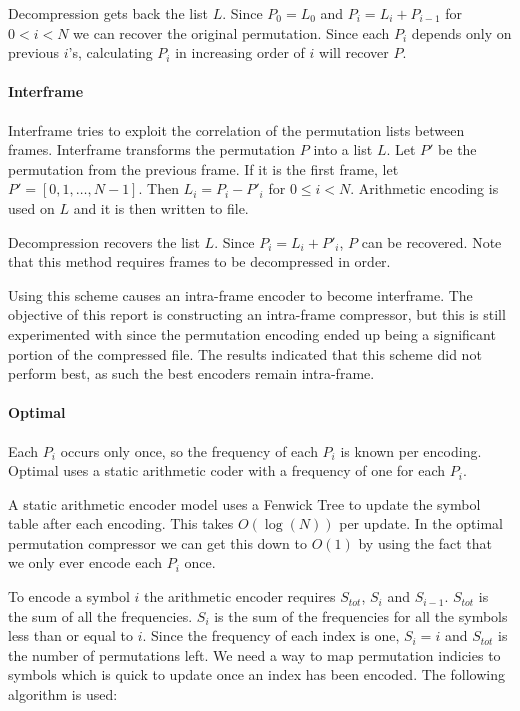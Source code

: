 \documentclass[a4paper]{report}
\begin{document}
Decompression gets back the list $L$. Since $P_0 = L_0$ and $P_i = L_i +
P_{i-1}$ for $0 < i < N$ we can recover the original permutation. Since each
$P_i$ depends only on previous $i$'s, calculating $P_i$ in increasing order of
$i$ will recover $P$.

\paragraph{Interframe}
Interframe tries to exploit the correlation of the permutation lists between
frames. Interframe transforms the permutation $P$ into a list $L$. Let $P'$ be
the permutation from the previous frame. If it is the first frame, let $P' =
[0,1,\dots,N-1]$. Then $L_i = P_i - P'_i$ for $0 \le i < N$. Arithmetic
encoding is used on $L$ and it is then written to file.

Decompression recovers the list $L$. Since $P_i = L_i + P'_i$, $P$ can be
recovered. Note that this method requires frames to be decompressed in order.

Using this scheme causes an intra-frame encoder to become interframe. The
objective of this report is constructing an intra-frame compressor, but this
is still experimented with since the permutation encoding ended up being a
significant portion of the compressed file. The results indicated that this
scheme did not perform best, as such the best encoders remain intra-frame.

\paragraph{Optimal}
Each $P_i$ occurs only once, so the frequency of each $P_i$ is known per
encoding. Optimal uses a static arithmetic coder with a frequency of one for
each $P_i$.

A static arithmetic encoder model uses a Fenwick Tree \citep{fenwick1994new}
to update the symbol table after each encoding. This takes $O(\log(N))$ per
update. In the optimal permutation compressor we can get this down to $O(1)$
by using the fact that we only ever encode each $P_i$ once.

To encode a symbol $i$ the arithmetic encoder requires $S_{tot}$, $S_i$ and
$S_{i-1}$. $S_{tot}$ is the sum of all the frequencies. $S_i$ is the sum of
the frequencies for all the symbols less than or equal to $i$. Since the
frequency of each index is one, $S_i = i$ and $S_{tot}$ is the number of
permutations left. We need a way to map permutation indicies to symbols which
is quick to update once an index has been encoded. The following algorithm is
used:
\end{document}
